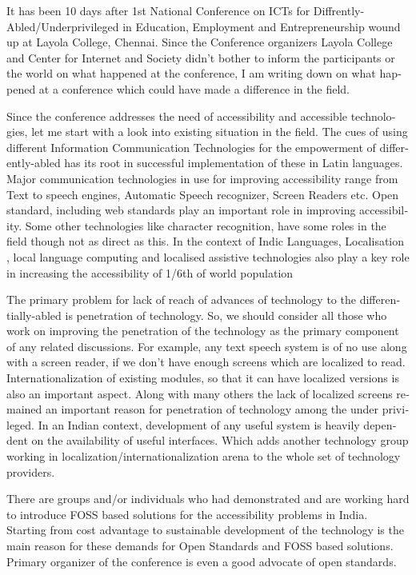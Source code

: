 \newpage
\begin{english}

It has been 10 days after 1st National Conference on ICTs for Diffrently-Abled/Underprivileged in Education, Employment and Entrepreneurship wound up at Layola College, Chennai. Since the Conference organizers Layola College and Center for Internet and Society didn’t bother to inform the participants or the world on what happened at the conference, I am writing down on what happened at a conference which could have made a difference in the field.

Since the conference addresses the need of accessibility and accessible technologies, let me start with a look into existing situation in the field. The cues of using different Information Communication Technologies for the empowerment of differently-abled has its root in successful implementation of these in Latin languages. Major communication technologies in use for improving accessibility range from Text to speech engines, Automatic Speech recognizer, Screen Readers etc. Open standard, including web standards play an important role in improving accessibility. Some other technologies like character recognition, have some roles in the field though not as direct as this. In the context of Indic Languages, Localisation , local language computing and localised assistive technologies also play a key role in increasing the accessibility of 1/6th of world population

The primary problem for lack of reach of advances of technology to the differentially-abled is penetration of technology. So, we should consider all those who work on improving the penetration of the technology as the primary component of any related discussions. For example, any text speech system is of no use along with a screen reader, if we don’t have enough screens which are localized to read. Internationalization of existing modules, so that it can have localized versions is also an important aspect. Along with many others the lack of localized screens remained an important reason for penetration of technology among the under privileged. In an Indian context, development of any useful system is heavily dependent on the availability of useful interfaces. Which adds another technology group working in localization/internationalization arena to the whole set of technology providers.

There are groups and/or individuals who had demonstrated and are working hard to introduce FOSS based solutions for the accessibility problems in India. Starting from cost advantage to sustainable development of the technology is the main reason for these demands for Open Standards and FOSS based solutions. Primary organizer of the conference is even a good advocate of open standards.


\end{english}
